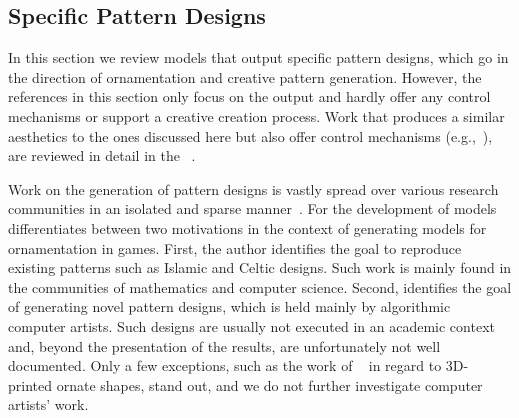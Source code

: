 \subsection{Specific Pattern Designs}
\label{subsec:specific_pattern_designs}

In this section we review models that output specific pattern designs, which go in the direction of ornamentation and creative pattern generation. However, the references in this section only focus on the output and hardly offer any control mechanisms or support a creative creation process. Work that produces a similar aesthetics to the ones discussed here but also offer control mechanisms (e.g.,~\cite{wong_1998_cgf,yu_2012_ans,zehnder_2016_dso}), are reviewed in detail in the ~.


Work on the generation of pattern designs is vastly spread over various research communities in an isolated and sparse manner~\cite{whitehead_2010_tpd}. For the development of models \citeauthor*{whitehead_2010_tpd}~\cite{whitehead_2010_tpd} differentiates between two motivations in the context of generating models for ornamentation in games. First, the author identifies the goal to reproduce existing patterns such as Islamic and Celtic designs. Such work is mainly found in the communities of mathematics and computer science. Second, \citeauthor*{whitehead_2010_tpd} identifies the goal of generating novel pattern designs, which is held mainly by algorithmic computer artists. Such designs are usually not executed in an academic context and, beyond the presentation of the results, are unfortunately not well documented. Only a few exceptions, such as the work of \citeauthor*{takayama_2016_med}~\cite{takayama_2016_med} in regard to 3D-printed ornate shapes, stand out, and we do not further investigate computer artists’ work.

